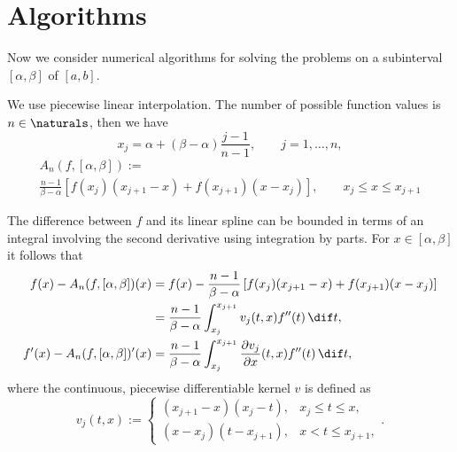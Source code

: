 \documentclass[]{elsarticle}
\theoremstyle{definition}
\theoremstyle{remark}
\begin{document}
\section{Algorithms}
Now we consider numerical algorithms for solving the problems on a subinterval $[\alpha, \beta]$ of $[a, b]$.

We use piecewise linear interpolation. The number of possible function values is $ n \in \naturals$, then we have
\begin{equation}
x_j= \alpha + (\beta-\alpha) \frac{j-1}{n-1}, \qquad j=1, \ldots, n,
\end{equation}
\begin{multline}
A_n(f,[\alpha,\beta]):=\\
\frac{n-1}{\beta-\alpha}\left[f(x_j)(x_{j+1}-x)+f(x_{j+1})(x-x_j)\right], \qquad  x_{j}\le x \le x_{j+1}
\end{multline}


The difference between $f$ and its linear spline can be bounded in terms of an integral involving the second derivative using integration by parts.  For $x \in [\alpha,\beta]$ it follows that
\begin{align}
f(x)-A_n(f,[\alpha,\beta])(x)
&= f(x) - \frac{n-1}{\beta-\alpha} \left[f(x_{j})(x_{j+1}-x) +f(x_{j+1})(x-x_j) \right] \nonumber\\
& = \frac{n-1}{\beta-\alpha}\int_{x_j}^{x_{j+1}} v_j(t,x) f''(t) \, \dif t, \label{fintermsfdoubprime}\\
f'(x)-A_n(f,[\alpha,\beta])'(x) & = \frac{n-1}{\beta-\alpha} \int_{x_j}^{x_{j+1}} \frac{\partial v_j}{\partial x}(t,x) f''(t) \, \dif t, \label{fprimeintermsfdoubprime}
\end{align}
where the continuous, piecewise differentiable kernel $v$ is defined as
\begin{equation*}
v_j(t,x) :=\begin{cases} (x_{j+1}-x)(x_j-t), & x_j\leq t\leq x,\\
(x-x_{j})(t- x_{j+1}), & x< t \leq x_{j+1},
\end{cases}.
\end{equation*}
\end{document}
